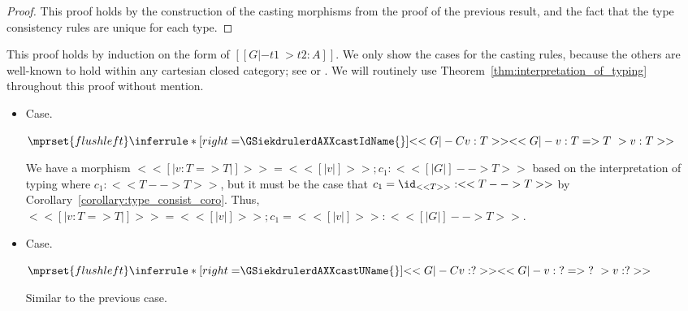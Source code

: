 \begin{proof}
  This proof holds by the construction of the casting morphisms from
  the proof of the previous result, and the fact that the type
  consistency rules are unique for each type.
\end{proof}

This proof holds by induction on the form of $[[G |- t1 ~> t2 : A]]$.
We only show the cases for the casting rules, because the others are
well-known to hold within any cartesian closed category; see
\cite{Lambek:1980} or \cite{Crole:1994}.  We will routinely use
Theorem~\ref{thm:interpretation_of_typing} throughout this proof
without mention.

\begin{itemize}
\item[] Case.\ \\ 
  \begin{center}
    \begin{math}
      $$\mprset{flushleft}
      \inferrule* [right=$\GSiekdrulerdAXXcastIdName{}$] {
        <<G |-C v : T>>
      }{<<G |- v : {T} => {T} ~> v : T>>}
    \end{math}
  \end{center}
  We have a morphism $<< [| v : {T} => {T} |] >> = << [| v |] >> ; c_1 : << [| G |] --> T>>$
  based on the interpretation of typing where $c_1 : << T --> T >>$, but it must be the
  case that $c_1 = \id_{<<T>>} : <<T --> T>>$ by Corollary~\ref{corollary:type_consist_coro}.
  Thus, $<< [| v : {T} => {T} |] >> = << [| v |] >> ; c_1  = << [| v |] >> : << [| G |] --> T>>$.

\item[] Case.\ \\ 
  \begin{center}
    \begin{math}
      $$\mprset{flushleft}
      \inferrule* [right=$\GSiekdrulerdAXXcastUName{}$] {
        <<G |-C v : ?>>
      }{<<G |- v : {?} => {?} ~> v : ?>>}
    \end{math}
  \end{center}
  Similar to the previous case.


\end{itemize}
